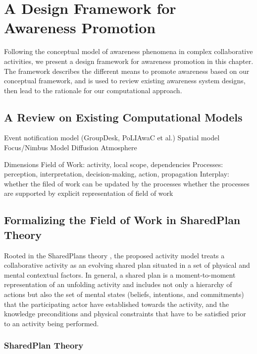 \graphicspath{{Figures/}}

\chapter{A Design Framework for Awareness Promotion} %
\label{cha:design_framework}

Following the conceptual model of awareness phenomena in complex collaborative activities, we present a design framework for awareness promotion in this chapter. The framework describes the different means to promote awareness based on our conceptual framework, and is used to review existing awareness system designs, then lead to the rationale for our computational approach.

\section{A Review on Existing Computational Models} %
\label{sec:a_review_on_existing_computational_models}


Event notification model (GroupDesk, PoLIAwaC et al.)
Spatial model
Focus/Nimbus Model
Diffusion
Atmosphere

Dimensions
Field of Work: activity, local scope, dependencies
Processes: perception, interpretation, decision-making, action, propagation
Interplay: 
whether the filed of work can be updated by the processes
whether the processes are supported by explicit representation of field of work


\section{Formalizing the Field of Work in SharedPlan Theory}
Rooted in the SharedPlans theory \cite{grosz1996collaborative,Grosz98theevolution}, the proposed activity model treats a collaborative activity as an evolving shared plan situated in a set of physical and mental contextual factors. In general, a shared plan is a moment-to-moment representation of an unfolding activity and includes not only a hierarchy of actions but also the set of mental states (beliefs, intentions, and commitments) that the participating actor have established towards the activity, and the knowledge preconditions and physical constraints that have to be satisfied prior to an activity being performed.

\subsection {SharedPlan Theory}
